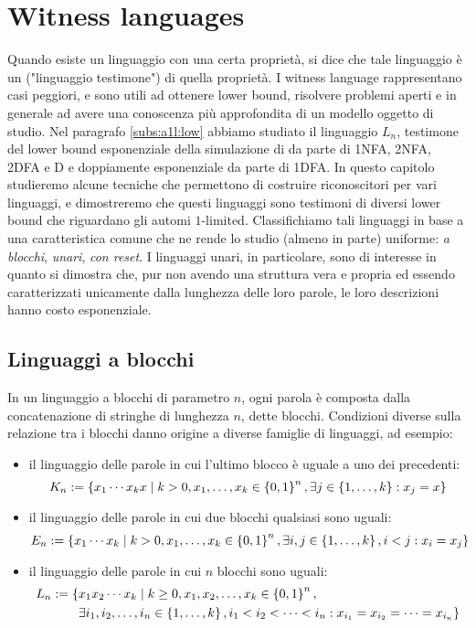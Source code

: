 \chapter{Witness languages}\label{cha:wit}
Quando esiste un linguaggio con una certa proprietà, si dice che tale linguaggio è un  ("linguaggio testimone") di quella proprietà. I witness language rappresentano casi peggiori, e sono utili ad ottenere lower bound, risolvere problemi aperti e in generale ad avere una conoscenza più approfondita di un modello oggetto di studio.
Nel paragrafo \ref{subs:a1l:low} abbiamo studiato il linguaggio $L_n$, testimone del lower bound esponenziale della simulazione di  da parte di 1NFA, 2NFA, 2DFA e D e doppiamente esponenziale da parte di 1DFA.
In questo capitolo studieremo alcune tecniche che permettono di costruire riconoscitori per vari linguaggi, e dimostreremo che questi linguaggi sono testimoni di diversi lower bound che riguardano gli automi $1$-limited.
Classifichiamo tali linguaggi in base a una caratteristica comune che ne rende lo studio (almeno in parte) uniforme: \emph{a blocchi}, \emph{unari}, \emph{con reset}. I linguaggi unari, in particolare, sono di interesse in quanto si dimostra che, pur non avendo una struttura vera e propria ed essendo caratterizzati unicamente dalla lunghezza delle loro parole, le loro descrizioni hanno costo esponenziale.



\section{Linguaggi a blocchi}\label{sec:wit:blk}
In un linguaggio a blocchi di parametro $n$, ogni parola è composta dalla concatenazione di stringhe di lunghezza $n$, dette blocchi. Condizioni diverse sulla relazione tra i blocchi danno origine a diverse famiglie di linguaggi, ad esempio:
\begin{itemize}
	\item il linguaggio delle parole in cui l'ultimo blocco è uguale a uno dei precedenti:
	      \begin{equation*}
		      K_n := \left\{ x_1\cdots x_kx \mid k>0, x_1,\dots,x_k\in\left\{ 0,1 \right\}^n, \exists j\in\left\{ 1,\dots,k \right\}: x_j=x \right\}
	      \end{equation*}
	\item il linguaggio delle parole in cui due blocchi qualsiasi sono uguali:
	      \begin{equation*}
		      E_n := \left\{ x_1\cdots x_k \mid k>0, x_1,\dots,x_k\in\left\{ 0,1 \right\}^n,\exists i,j\in\left\{ 1,\dots,k \right\},i<j: x_i=x_j \right\}
	      \end{equation*}
	\item il linguaggio delle parole in cui $n$ blocchi sono uguali:
	      \begin{align*}
		      L_n := \{ & x_1x_2\cdots x_k\mid k\geq0, x_1,x_2,\dots,x_k\in \left\{ 0,1 \right\}^n,                                  \\
		                & \exists i_1,i_2,\dots,i_n\in\left\{ 1,\dots,k \right\},i_1<i_2<\dots<i_n: x_{i_1}=x_{i_2}=\dots=x_{i_n} \}
	      \end{align*}
\end{itemize}

